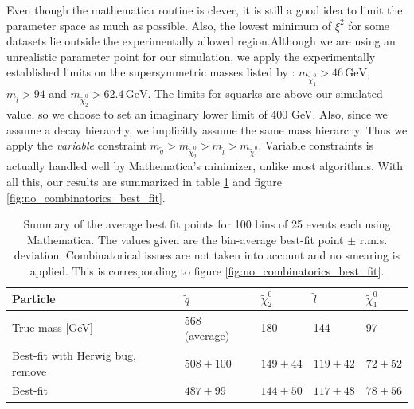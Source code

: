 \documentclass[twoside,english]{uiofysmaster}
\begin{document}
\newpage %

Even though the mathematica routine is clever, it is still a good idea to limit the parameter space as much as possible. Also, the lowest minimum of $\xi^2$ for some datasets lie outside the experimentally allowed region.Although we are using an unrealistic parameter point for our simulation, we apply the experimentally established limits on the supersymmetric masses listed by \cite{Beringer:1900zz}: $m_{\tilde \chi^0_1}>46 \, \mathrm{GeV}$, $m_{\tilde l} > 94$ and $m_{\tilde\chi^0_2} > 62.4 \, \mathrm{GeV}$. The limits for squarks are above our simulated value, so we choose to set an imaginary lower limit of 400 GeV. Also, since we assume a decay hierarchy, we implicitly assume the same mass hierarchy. Thus we apply the {\it variable} constraint $m_{\tilde q} > m_{\tilde \chi^0_2} > m_{\tilde l} > m_{\tilde \chi^0_1}$. Variable constraints is actually handled well by Mathematica's minimizer, unlike most algorithms. With all this, our results are summarized in table \ref{table:no_combinatorics_best_fit} and figure \ref{fig:no_combinatorics_best_fit}.

\begin{table}[hbt]
	\centering
	\begin{tabular}{| l | l | l | l | l |}
		\hline
		Particle 			& $\tilde q$	& $\tilde \chi_2^0$	& $\tilde l$	& $\tilde \chi_1^0$ \\ \hline
		True mass [GeV]		& 568 (average) & 180 				& 144 			& 97 				\\ \hline
		Best-fit with Herwig bug, remove 	& $508 \pm 100$ 	& $149 \pm 44$ 	& $119 \pm 42$	& $72 \pm 52$ \\ \hline
		Best-fit & $487 \pm 99$ 	& $144 \pm 50$ 	& $117 \pm 48$	& $78 \pm 56$ \\ \hline
	\end{tabular}
	\caption{Summary of the average best fit points for 100 bins of 25 events each using Mathematica. The values given are the bin-average best-fit point $\pm$ r.m.s. deviation. Combinatorical issues are not taken into account and no smearing is applied. This is corresponding to figure \ref{fig:no_combinatorics_best_fit}.}
	\label{table:no_combinatorics_best_fit}
\end{table}
\end{document}
